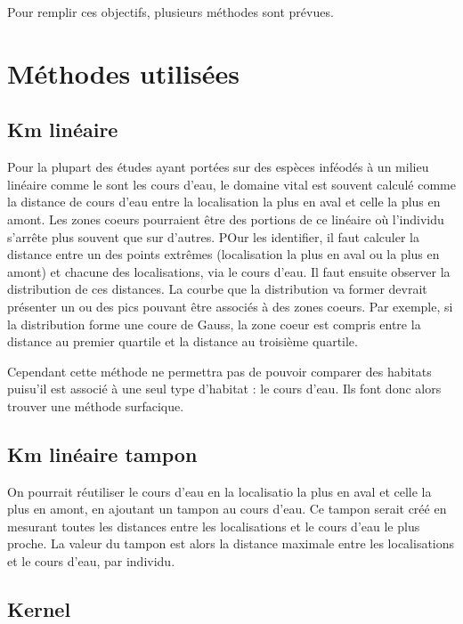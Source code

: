 \documentclass[
  letterpaper,
  DIV=11,
  numbers=noendperiod]{scrreprt}
\begin{document}
Pour remplir ces objectifs, plusieurs méthodes sont prévues.

\section{Méthodes utilisées}\label{muxe9thodes-utilisuxe9es}

\subsection{Km linéaire}\label{km-linuxe9aire}

Pour la plupart des études ayant portées sur des espèces inféodés à un
milieu linéaire comme le sont les cours d'eau, le domaine vital est
souvent calculé comme la distance de cours d'eau entre la localisation
la plus en aval et celle la plus en amont. Les zones coeurs pourraient
être des portions de ce linéaire où l'individu s'arrête plus souvent que
sur d'autres. POur les identifier, il faut calculer la distance entre un
des points extrêmes (localisation la plus en aval ou la plus en amont)
et chacune des localisations, via le cours d'eau. Il faut ensuite
observer la distribution de ces distances. La courbe que la distribution
va former devrait présenter un ou des pics pouvant être associés à des
zones coeurs. Par exemple, si la distribution forme une coure de Gauss,
la zone coeur est compris entre la distance au premier quartile et la
distance au troisième quartile.

Cependant cette méthode ne permettra pas de pouvoir comparer des
habitats puisu'il est associé à une seul type d'habitat : le cours
d'eau. Ils font donc alors trouver une méthode surfacique.

\subsection{Km linéaire tampon}\label{km-linuxe9aire-tampon}

On pourrait réutiliser le cours d'eau en la localisatio la plus en aval
et celle la plus en amont, en ajoutant un tampon au cours d'eau. Ce
tampon serait créé en mesurant toutes les distances entre les
localisations et le cours d'eau le plus proche. La valeur du tampon est
alors la distance maximale entre les localisations et le cours d'eau,
par individu.

\subsection{Kernel}\label{kernel}
\end{document}
